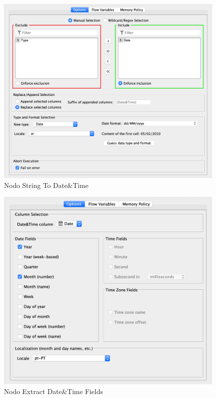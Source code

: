 \begin{figure}[H]
    \centering
    \includegraphics[scale=0.3]{Images/T2_b1.png}
    \caption{Nodo String To Date\&Time}
\end{figure}

\begin{figure}[H]
    \centering
    \includegraphics[scale=0.3]{Images/T2_b2.png}
    \caption{Nodo Extract Date\&Time Fields}
\end{figure}

